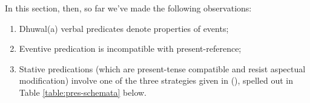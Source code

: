 \noindent In this section, then, so far we've made the following observations:
\begin{enumerate}[\bf\sf i.]
	\item Dhuwal(a) verbal predicates denote properties of events;
	\item Eventive predication is incompatible with present-reference;
	\item Stative predications (which are present-tense compatible and resist aspectual modification) involve one of the three strategies given in (), spelled out in Table \ref{table:pres-schemata} below. 
\end{enumerate}





\exdisplay[glwidth=.35\linewidth]\label{table:pres-schemata}
